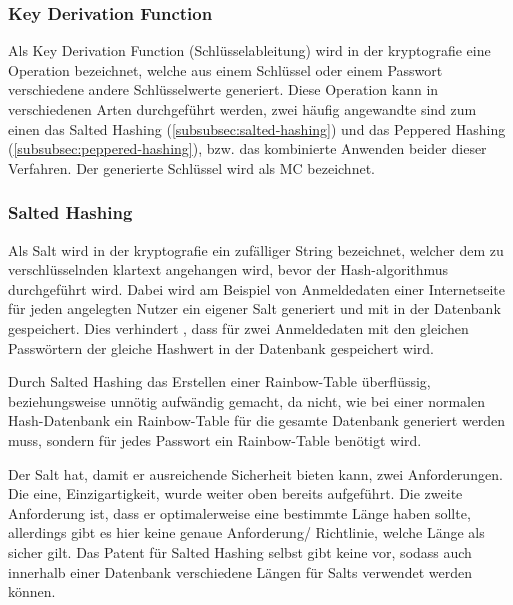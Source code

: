 \subsubsection{Key Derivation Function}\label{subsubsec:key-derivation-function}
Als Key Derivation Function (Schlüsselableitung) wird in der \gls{kryptografie} eine Operation bezeichnet, welche aus einem Schlüssel oder einem Passwort verschiedene andere Schlüsselwerte generiert.\autocite[\vglf][]{NIST:800132} Diese Operation kann in verschiedenen Arten durchgeführt werden, zwei häufig angewandte sind zum einen das Salted Hashing (\autoref{subsubsec:salted-hashing}) und das Peppered Hashing (\autoref{subsubsec:peppered-hashing}), bzw. das kombinierte Anwenden beider dieser Verfahren. Der generierte Schlüssel wird als \ac{MC} bezeichnet.


\subsubsection{Salted Hashing}\label{subsubsec:salted-hashing}
Als Salt wird in der \gls{kryptografie} ein zufälliger String bezeichnet, welcher dem zu verschlüsselnden \gls{klartext} angehangen wird, bevor der Hash-\gls{algorithmus} durchgeführt wird\autocite[\vglf][]{JoyOfCryptography:2021}. Dabei wird am Beispiel von Anmeldedaten einer Internetseite für jeden angelegten Nutzer ein eigener Salt generiert und mit in der Datenbank gespeichert.
Dies verhindert \uamol, dass für zwei Anmeldedaten mit den gleichen Passwörtern der gleiche Hashwert in der Datenbank gespeichert wird.

Durch Salted Hashing das Erstellen einer \gls{Rainbow-Table} überflüssig, beziehungsweise unnötig aufwändig gemacht, da nicht, wie bei einer normalen Hash-Datenbank ein \gls{Rainbow-Table} für die gesamte Datenbank generiert werden muss, sondern für jedes Passwort ein \gls{Rainbow-Table} benötigt wird\autocite[\vglf][]{JoyOfCryptography:2021}.

Der Salt hat, damit er ausreichende Sicherheit bieten kann, zwei Anforderungen. Die eine, Einzigartigkeit, wurde weiter oben bereits aufgeführt. Die zweite Anforderung ist, dass er optimalerweise eine bestimmte Länge haben sollte, allerdings gibt es hier keine genaue Anforderung/ Richtlinie, welche Länge als sicher gilt. Das Patent für Salted Hashing selbst gibt keine vor\autocite[\vglf][]{patent:saltedHashing}, sodass auch innerhalb einer Datenbank verschiedene Längen für Salts verwendet werden können.

